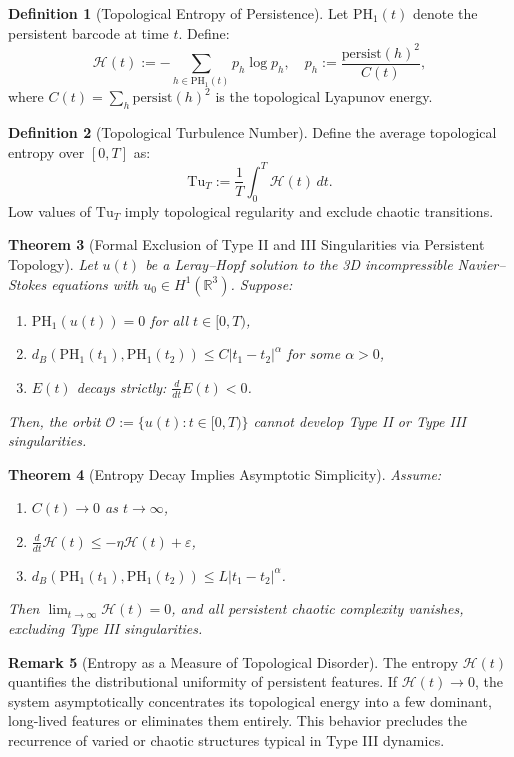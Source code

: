 \documentclass[11pt]{article}
\newtheorem{theorem}{Theorem}[section]
\theoremstyle{definition}
\newtheorem{definition}[theorem]{Definition}
\newtheorem{remark}[theorem]{Remark}
\begin{document}
\begin{definition}[Topological Entropy of Persistence]
Let $\mathrm{PH}_1(t)$ denote the persistent barcode at time $t$. Define:
\[
\mathcal{H}(t) := -\sum_{h \in \mathrm{PH}_1(t)} p_h \log p_h, \quad p_h := \frac{\mathrm{persist}(h)^2}{C(t)},
\]
where $C(t) = \sum_{h} \mathrm{persist}(h)^2$ is the topological Lyapunov energy.
\end{definition}

\begin{definition}[Topological Turbulence Number]
Define the average topological entropy over $[0,T]$ as:
\[
\mathrm{Tu}_T := \frac{1}{T} \int_0^T \mathcal{H}(t) \, dt.
\]
Low values of $\mathrm{Tu}_T$ imply topological regularity and exclude chaotic transitions.
\end{definition}

\begin{theorem}[Formal Exclusion of Type II and III Singularities via Persistent Topology]
\label{thm:formal_typeII_III_exclusion}
Let $u(t)$ be a Leray--Hopf solution to the 3D incompressible Navier--Stokes equations with $u_0 \in H^1(\mathbb{R}^3)$. Suppose:
\begin{enumerate}
    \item $\mathrm{PH}_1(u(t)) = 0$ for all $t \in [0, T)$,
    \item $d_B(\mathrm{PH}_1(t_1), \mathrm{PH}_1(t_2)) \le C |t_1 - t_2|^\alpha$ for some $\alpha > 0$,
    \item $E(t)$ decays strictly: $\frac{d}{dt} E(t) < 0$.
\end{enumerate}
Then, the orbit $\mathcal{O} := \{u(t): t \in [0,T)\}$ cannot develop Type II or Type III singularities.
\end{theorem}

\begin{theorem}[Entropy Decay Implies Asymptotic Simplicity]
Assume:
\begin{enumerate}
    \item $C(t) \to 0$ as $t \to \infty$,
    \item $\frac{d}{dt} \mathcal{H}(t) \le -\eta \mathcal{H}(t) + \varepsilon$,
    \item $d_B(\mathrm{PH}_1(t_1), \mathrm{PH}_1(t_2)) \le L|t_1 - t_2|^\alpha$.
\end{enumerate}
Then $\lim_{t \to \infty} \mathcal{H}(t) = 0$, and all persistent chaotic complexity vanishes, excluding Type III singularities.
\end{theorem}

\begin{remark}[Entropy as a Measure of Topological Disorder]
The entropy $\mathcal{H}(t)$ quantifies the distributional uniformity of persistent features. If $\mathcal{H}(t) \to 0$, the system asymptotically concentrates its topological energy into a few dominant, long-lived features or eliminates them entirely. This behavior precludes the recurrence of varied or chaotic structures typical in Type III dynamics.
\end{remark}
\end{document}
